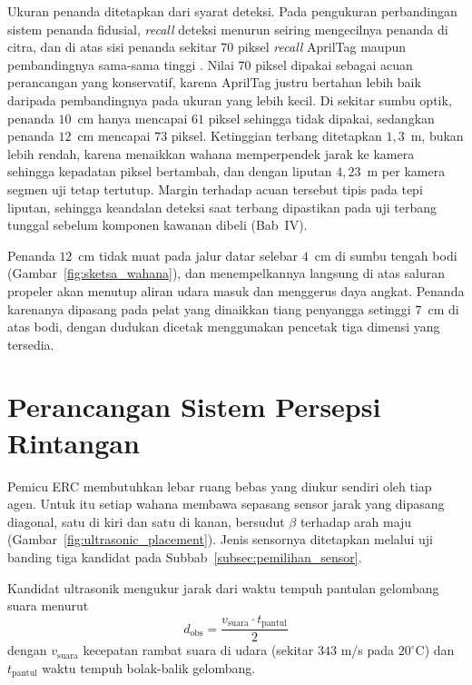 \documentclass[12pt,a4paper]{report}
\begin{document}
Ukuran penanda ditetapkan dari syarat deteksi. Pada pengukuran perbandingan sistem penanda fidusial, \textit{recall} deteksi menurun seiring mengecilnya penanda di citra, dan di atas sisi penanda sekitar $70$ piksel \textit{recall} AprilTag maupun pembandingnya sama-sama tinggi \cite{degolChromaTagColoredMarker2017}. Nilai $70$ piksel dipakai sebagai acuan perancangan yang konservatif, karena AprilTag justru bertahan lebih baik daripada pembandingnya pada ukuran yang lebih kecil. Di sekitar sumbu optik, penanda $10$~cm hanya mencapai $61$ piksel sehingga tidak dipakai, sedangkan penanda $12$~cm mencapai $73$ piksel. Ketinggian terbang ditetapkan $1{,}3$~m, bukan lebih rendah, karena menaikkan wahana memperpendek jarak ke kamera sehingga kepadatan piksel bertambah, dan dengan liputan $4{,}23$~m per kamera segmen uji tetap tertutup. Margin terhadap acuan tersebut tipis pada tepi liputan, sehingga keandalan deteksi saat terbang dipastikan pada uji terbang tunggal sebelum komponen kawanan dibeli (Bab~IV).

Penanda $12$~cm tidak muat pada jalur datar selebar $4$~cm di sumbu tengah bodi (Gambar~\ref{fig:sketsa_wahana}), dan menempelkannya langsung di atas saluran propeler akan menutup aliran udara masuk dan menggerus daya angkat. Penanda karenanya dipasang pada pelat yang dinaikkan tiang penyangga setinggi $7$~cm di atas bodi, dengan dudukan dicetak menggunakan pencetak tiga dimensi yang tersedia.

\section{Perancangan Sistem Persepsi Rintangan}

Pemicu ERC membutuhkan lebar ruang bebas yang diukur sendiri oleh tiap agen. Untuk itu setiap wahana membawa sepasang sensor jarak yang dipasang diagonal, satu di kiri dan satu di kanan, bersudut $\beta$ terhadap arah maju (Gambar~\ref{fig:ultrasonic_placement}). Jenis sensornya ditetapkan melalui uji banding tiga kandidat pada Subbab~\ref{subsec:pemilihan_sensor}.

Kandidat ultrasonik mengukur jarak dari waktu tempuh pantulan gelombang suara \cite{siegwartIntroductionAutonomousMobile2004, borensteinObstacleAvoidanceUltrasonic1988} menurut
\begin{equation}
    d_{\text{obs}} = \frac{v_{\text{suara}} \cdot t_{\text{pantul}}}{2}
\end{equation}
dengan $v_{\text{suara}}$ kecepatan rambat suara di udara (sekitar $343$ m/s pada $20^\circ\text{C}$) dan $t_{\text{pantul}}$ waktu tempuh bolak-balik gelombang.
\end{document}
